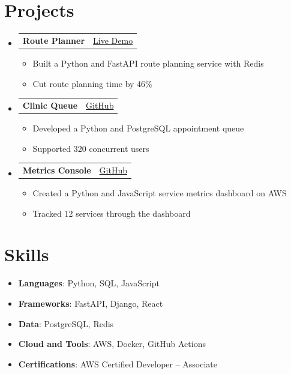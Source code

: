 \documentclass[letterpaper,11pt]{article}
\makeatletter
\newcommand{\resumeProjectHeading}[2]{
  \vspace{-1pt}\item
  \begin{tabular*}{0.97\textwidth}[t]{l@{\extracolsep{\fill}}r}
    \textbf{#1} & \small #2 \\
  \end{tabular*}\vspace{-5pt}
}
\newcommand{\resumeItemPlain}[1]{
  \item\small{
    {#1 \vspace{-2pt}}
  }
}
\newcommand{\resumeSubHeadingListStart}{\begin{itemize}[leftmargin=*]}
\newcommand{\resumeSubHeadingListEnd}{\end{itemize}}
\newcommand{\resumeItemListStart}{\begin{itemize}}
\newcommand{\resumeItemListEnd}{\end{itemize}\vspace{-5pt}}
\makeatother
\begin{document}
\section{Projects}
\resumeSubHeadingListStart
\resumeProjectHeading{Route Planner}{\href{\detokenize{https://jordanlee.example.com/route-planner}}{Live Demo}}
    \resumeItemListStart
      \resumeItemPlain{Built a Python and FastAPI route planning service with Redis}
      \resumeItemPlain{Cut route planning time by 46\%}
    \resumeItemListEnd
\resumeProjectHeading{Clinic Queue}{\href{\detokenize{https://github.com/jordan-lee-example/clinic-queue}}{GitHub}}
    \resumeItemListStart
      \resumeItemPlain{Developed a Python and PostgreSQL appointment queue}
      \resumeItemPlain{Supported 320 concurrent users}
    \resumeItemListEnd
\resumeProjectHeading{Metrics Console}{\href{\detokenize{https://github.com/jordan-lee-example/metrics-console}}{GitHub}}
    \resumeItemListStart
      \resumeItemPlain{Created a Python and JavaScript service metrics dashboard on AWS}
      \resumeItemPlain{Tracked 12 services through the dashboard}
    \resumeItemListEnd
\resumeSubHeadingListEnd

\section{Skills}
\resumeSubHeadingListStart
  \item\small{\textbf{Languages}{: Python, SQL, JavaScript}}
  \item\small{\textbf{Frameworks}{: FastAPI, Django, React}}
  \item\small{\textbf{Data}{: PostgreSQL, Redis}}
  \item\small{\textbf{Cloud and Tools}{: AWS, Docker, GitHub Actions}}
  \item\small{\textbf{Certifications}{: AWS Certified Developer -- Associate}}
\resumeSubHeadingListEnd
\end{document}
